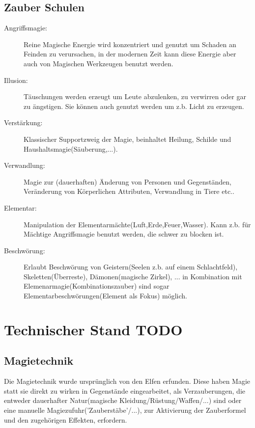 \section{Zauber Schulen}
\begin{description}

\item[Angriffsmagie:] Reine Magische Energie wird konzentriert und genutzt um Schaden an Feinden zu verursachen, in der modernen Zeit kann diese Energie aber auch von Magischen Werkzeugen benutzt werden.

\item[Illusion:] Täuschungen werden erzeugt um Leute abzulenken, zu verwirren oder gar zu ängstigen. Sie können auch genutzt werden um z.b. Licht zu erzeugen.

\item[Verstärkung:] Klassischer Supportzweig der Magie, beinhaltet Heilung, Schilde und Haushaltsmagie(Säuberung,...).

\item[Verwandlung:] Magie zur (dauerhaften) Änderung von Personen und Gegenständen, Veränderung von Körperlichen Attributen, Verwandlung in Tiere etc..

\item[Elementar:] Manipulation der Elementarmächte(Luft,Erde,Feuer,Wasser). Kann z.b. für Mächtige Angriffsmagie benutzt werden, die schwer zu blocken ist.

\item[Beschwörung:] Erlaubt Beschwörung von Geistern(Seelen z.b. auf einem Schlachtfeld), Skeletten(Überreste), Dämonen(magische Zirkel), ... in Kombination mit Elemenarmagie(Kombinationszauber) sind sogar Elementarbeschwörungen(Element als Fokus) möglich.
\end{description}

\chapter{Technischer Stand TODO}

\section{Magietechnik}

Die Magietechnik wurde ursprünglich von den Elfen erfunden. Diese haben Magie statt sie direkt zu wirken in Gegenstände eingearbeitet, als Verzauberungen, die entweder dauerhafter Natur(magische Kleidung/Rüstung/Waffen/...) sind oder eine manuelle Magiezufuhr('Zauberstäbe'/...), zur Aktivierung der Zauberformel und den zugehörigen Effekten, erfordern.

